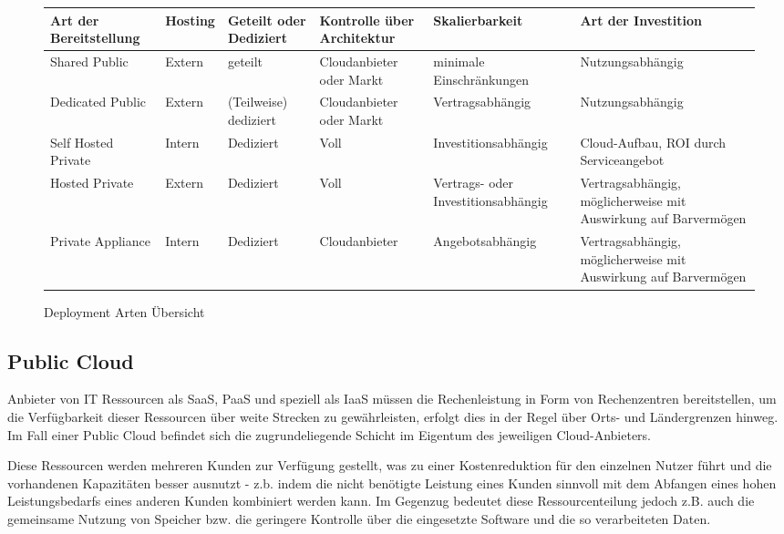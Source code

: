 \begin{figure}
	\begin{tabular}{|>{\RaggedRight}p{3cm}|>{\RaggedRight}p{1.6cm}|>{\RaggedRight}p{2.2cm}|>{\RaggedRight}p{2.5cm}|>{\RaggedRight}p{2.7cm}|>{\RaggedRight}p{3cm}|}
		\hline
		\rule[-2ex]{0pt}{5.5ex} \textbf{Art der \newline  Bereitstellung} & \textbf{Hosting} & \textbf{Geteilt oder Dediziert} & \textbf{Kontrolle über Architektur} & \textbf{Skalierbarkeit} & \textbf{Art der Investition} \\ 
		\hline
		\rule[-2ex]{0pt}{5.5ex} Shared Public & Extern & geteilt & Cloudanbieter oder Markt & minimale Einschränkungen & Nutzungsabhängig \\ 
		\hline
		\rule[-2ex]{0pt}{5.5ex} Dedicated Public & Extern & (Teilweise) dediziert & Cloudanbieter oder Markt & Vertragsabhängig & Nutzungsabhängig \\ 
		\hline
		\rule[-2ex]{0pt}{5.5ex} Self Hosted Private & Intern & Dediziert & Voll & Investitionsabhängig & Cloud-Aufbau, ROI durch Serviceangebot \\ 
		\hline
		\rule[-2ex]{0pt}{5.5ex} Hosted Private & Extern & Dediziert & Voll & Vertrags- oder Investitionsabhängig & Vertragsabhängig, möglicherweise mit Auswirkung auf Barvermögen \\ 
		\hline \rule[-2ex]{0pt}{5.5ex} Private Appliance & Intern & Dediziert & Cloudanbieter & Angebotsabhängig & Vertragsabhängig, möglicherweise mit Auswirkung auf Barvermögen \\ 
		\hline 
	\end{tabular}
	\centering
	\caption{Deployment Arten Übersicht}
	\label{deploymentTypesTable}
\end{figure}

\subsection{Public Cloud}
Anbieter von IT Ressourcen als SaaS, PaaS und speziell als IaaS müssen die Rechenleistung in Form von Rechenzentren bereitstellen, um die Verfügbarkeit dieser Ressourcen über weite Strecken zu gewährleisten, erfolgt dies in der Regel über Orts- und Ländergrenzen hinweg. Im Fall einer Public Cloud befindet sich die zugrundeliegende Schicht im Eigentum des jeweiligen Cloud-Anbieters.

Diese Ressourcen werden mehreren Kunden zur Verfügung gestellt, was zu einer Kostenreduktion für den einzelnen Nutzer führt und die vorhandenen Kapazitäten besser ausnutzt - z.b. indem die nicht benötigte Leistung eines Kunden sinnvoll mit dem Abfangen eines hohen Leistungsbedarfs eines anderen Kunden kombiniert werden kann.
Im Gegenzug bedeutet diese Ressourcenteilung jedoch z.B. auch die gemeinsame Nutzung von Speicher bzw. die geringere Kontrolle über die eingesetzte Software und die so verarbeiteten Daten.

